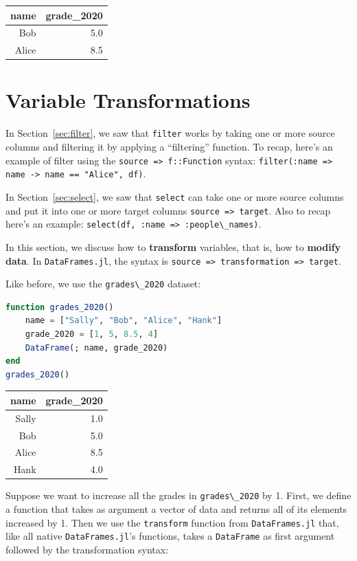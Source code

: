 \documentclass[
  notoc %
]{tufte-book}
\newcommand{\passthrough}[1]{#1}
\begin{document}
\begin{longtable}[]{@{}rr@{}}
\toprule
name & grade\_2020 \\
\midrule
\endhead
Bob & 5.0 \\
Alice & 8.5 \\
\bottomrule
\end{longtable}

\hypertarget{variable-transformations}{%
\section{Variable Transformations}\label{variable-transformations}}

In Section~\ref{sec:filter}, we saw that
\passthrough{\lstinline!filter!} works by taking one or more source
columns and filtering it by applying a ``filtering'' function. To recap,
here's an example of filter using the
\passthrough{\lstinline!source => f::Function!} syntax:
\passthrough{\lstinline!filter(:name => name -> name == "Alice", df)!}.

In Section~\ref{sec:select}, we saw that
\passthrough{\lstinline!select!} can take one or more source columns and
put it into one or more target columns
\passthrough{\lstinline!source => target!}. Also to recap here's an
example: \passthrough{\lstinline!select(df, :name => :people\_names)!}.

In this section, we discuss how to \textbf{transform} variables, that
is, how to \textbf{modify data}. In
\passthrough{\lstinline!DataFrames.jl!}, the syntax is
\passthrough{\lstinline!source => transformation => target!}.

Like before, we use the \passthrough{\lstinline!grades\_2020!} dataset:

\begin{lstlisting}[language=Julia]
function grades_2020()
    name = ["Sally", "Bob", "Alice", "Hank"]
    grade_2020 = [1, 5, 8.5, 4]
    DataFrame(; name, grade_2020)
end
grades_2020()
\end{lstlisting}

\begin{longtable}[]{@{}rr@{}}
\toprule
name & grade\_2020 \\
\midrule
\endhead
Sally & 1.0 \\
Bob & 5.0 \\
Alice & 8.5 \\
Hank & 4.0 \\
\bottomrule
\end{longtable}

Suppose we want to increase all the grades in
\passthrough{\lstinline!grades\_2020!} by 1. First, we define a function
that takes as argument a vector of data and returns all of its elements
increased by 1. Then we use the \passthrough{\lstinline!transform!}
function from \passthrough{\lstinline!DataFrames.jl!} that, like all
native \passthrough{\lstinline!DataFrames.jl!}'s functions, takes a
\passthrough{\lstinline!DataFrame!} as first argument followed by the
transformation syntax:
\end{document}
